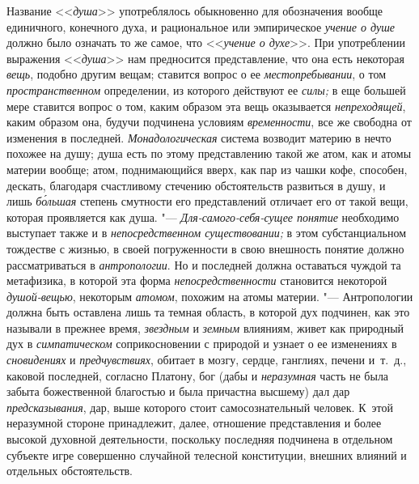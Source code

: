 Название <<{\em душа}>>
употреблялось обыкновенно для обозначения
вообще единичного, конечного духа, и рациональное или эмпирическое
{\em учение о душе}
должно было означать то же самое, что
<<{\em учение о духе}>>.
При употреблении выражения
<<{\em душа}>> нам
предносится представление, что она есть некоторая
{\em вещь}, подобно
другим вещам; ставится вопрос о ее
{\em местопребывании}, о
том {\em пространственном}
определении, из которого действуют ее
{\em силы;} в еще большей
мере ставится вопрос о том, каким образом эта вещь оказывается
{\em непреходящей}, каким
образом она, будучи подчинена условиям
{\em временности}, все же
свободна от изменения в последней.
{\em Монадологическая}
система возводит материю в нечто похожее на душу; душа есть
по этому представлению такой же атом, как и атомы материи вообще; атом,
поднимающийся вверх, как пар из чашки кофе, способен, дескать, благодаря
счастливому стечению обстоятельств развиться в душу, и лишь
{\em б\'{о}льшая} степень
смутности его представлений отличает его от такой вещи, которая проявляется
как душа. "--- {\em Для-самого-себя-сущее
понятие} необходимо выступает также и в
{\em непосредственном существовании;}
в этом субстанциальном тождестве с жизнью, в своей
погруженности в свою внешность понятие должно рассматриваться в
{\em антропологии}. Но и
последней должна оставаться чуждой та метафизика, в которой эта форма
{\em непосредственности}
становится некоторой
{\em душой-вещью},
некоторым {\em атомом},
похожим на атомы материи. "--- Антропологии
должна быть оставлена лишь та темная область, в которой дух подчинен, как
это называли в прежнее время,
{\em звездным} и
{\em земным} влияниям,
живет как природный дух в
{\em симпатическом}
соприкосновении с природой и узнает о ее изменениях в
{\em сновидениях} и
{\em предчувствиях},
обитает в мозгу, сердце, ганглиях, печени и~т.~д., каковой
последней, согласно Платону, бог (дабы и
{\em неразумная} часть не
была забыта божественной благостью и была причастна высшему) дал дар
{\em предсказывания},
дар, выше которого стоит самосознательный человек. К~этой
неразумной стороне принадлежит, далее, отношение
представления и более высокой духовной деятельности, поскольку последняя
подчинена в отдельном субъекте игре совершенно случайной телесной
конституции, внешних влияний и отдельных обстоятельств.

